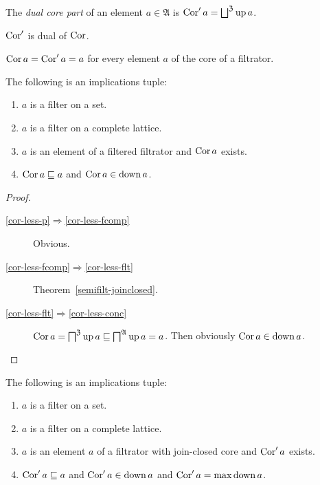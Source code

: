 \begin{defn}
The \emph{dual core part} of an element $a\in\mathfrak{A}$
is $\Cor'a=\bigsqcup^{\mathfrak{Z}}\up a$.\end{defn}
\begin{obvious}
$\operatorname{Cor}'$ is dual of $\operatorname{Cor}$.
\end{obvious}

\begin{obvious}
$\operatorname{Cor} a=\operatorname{Cor}'a=a$ for every element $a$ of the core of a filtrator.\end{obvious}
\begin{thm}
\label{cor-less}The following is an implications tuple:
\begin{enumerate}
\item \label{cor-less-p}$a$ is a filter on a set.
\item \label{cor-less-fcomp}$a$ is a filter on a complete lattice.
\item \label{cor-less-flt}$a$ is an element of a filtered filtrator and
$\operatorname{Cor} a$ exists.
\item \label{cor-less-conc}$\operatorname{Cor} a\sqsubseteq a$ and $\operatorname{Cor} a\in\operatorname{down} a$.
\end{enumerate}
\end{thm}
\begin{proof}
~
\begin{description}
\item [{\ref{cor-less-p}$\Rightarrow$\ref{cor-less-fcomp}}] Obvious.
\item [{\ref{cor-less-fcomp}$\Rightarrow$\ref{cor-less-flt}}] Theorem~\ref{semifilt-joinclosed}.
\item [{\ref{cor-less-flt}$\Rightarrow$\ref{cor-less-conc}}] $\operatorname{Cor} a=\bigsqcap^{\mathfrak{Z}}\operatorname{up} a\sqsubseteq\bigsqcap^{\mathfrak{A}}\operatorname{up} a=a$.
Then obviously $\operatorname{Cor} a\in\operatorname{down} a$.
\end{description}
\end{proof}
\begin{thm}
\label{f-cor-max}The following is an implications tuple:
\begin{enumerate}
\item \label{cor'a-le-p}$a$ is a filter on a set.
\item \label{cor'a-le-fltr}$a$ is a filter on a complete lattice.
\item \label{cor'a-le-a-jce}$a$ is an element $a$ of a filtrator with
join-closed core and $\operatorname{Cor}'a$ exists.
\item \label{cor'a-le-a}$\operatorname{Cor}'a\sqsubseteq a$ and $\operatorname{Cor}'a\in\operatorname{down} a$
and $\operatorname{Cor}'a=\max\operatorname{down} a$.
\end{enumerate}
\end{thm}
